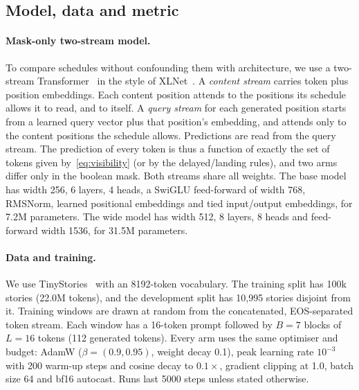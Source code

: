 \documentclass[11pt]{article}
\theoremstyle{definition}
\theoremstyle{remark}
\newcommand{\sch}[1]{\textsf{#1}}
\begin{document}
\subsection{Model, data and metric}

\paragraph{Mask-only two-stream model.}
To compare schedules without confounding them with architecture, we use a two-stream Transformer~\citep{vaswani2017attention} in the style of XLNet~\citep{yang2019xlnet}.
A \emph{content stream} carries token plus position embeddings.
Each content position attends to the positions its schedule allows it to read, and to itself.
A \emph{query stream} for each generated position starts from a learned query vector plus that position's embedding, and attends only to the content positions the schedule allows.
Predictions are read from the query stream.
The prediction of every token is thus a function of exactly the set of tokens given by~\eqref{eq:visibility} (or by the \sch{delayed}/\sch{landing} rules), and two arms differ only in the boolean mask.
Both streams share all weights.
The base model has width 256, 6 layers, 4 heads, a SwiGLU feed-forward of width 768, RMSNorm, learned positional embeddings and tied input/output embeddings, for 7.2M parameters.
The wide model has width 512, 8 layers, 8 heads and feed-forward width 1536, for 31.5M parameters.

\paragraph{Data and training.}
We use TinyStories~\citep{eldan2023tinystories} with an 8192-token vocabulary.
The training split has 100k stories (22.0M tokens), and the development split has 10{,}995 stories disjoint from it.
Training windows are drawn at random from the concatenated, EOS-separated token stream.
Each window has a 16-token prompt followed by $B=7$ blocks of $L=16$ tokens (112 generated tokens).
Every arm uses the same optimiser and budget: AdamW ($\beta=(0.9,0.95)$, weight decay 0.1), peak learning rate $10^{-3}$ with 200 warm-up steps and cosine decay to $0.1\times$, gradient clipping at 1.0, batch size 64 and bf16 autocast.
Runs last 5000 steps unless stated otherwise.
\end{document}
